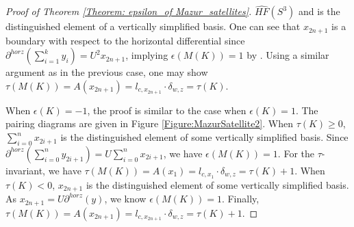\documentclass{amsart}
\theoremstyle{definition}
\theoremstyle{remark}
\numberwithin{equation}{section}
\numberwithin{equation}{section} \makeatletter
\begin{document}
\begin{proof}[Proof of Theorem \ref{Theorem: epsilon_of Mazur_satellites}]
$\widehat{HF}(S^3)$ and is the distinguished element of a vertically simplified basis. One can see that $x_{2n+1}$ is a boundary with respect to the horizontal differential since $\partial^{horz}(\sum_{i=1}^{k}y_i)=U^2x_{2n+1}$, implying $\epsilon(M(K))=1$ by \cite[Lemma 3.2 and Definition 3.4]{MR3217622}. Using a similar argument as in the previous case, one may show $\tau(M(K))=A(x_{2n+1})=l_{c,x_{2n+1}}\cdot \delta_{w,z}=\tau(K)$.
	
	When $\epsilon(K)=-1$, the proof is similar to the case when $\epsilon(K)=1$. The pairing diagrams are given in Figure \ref{Figure:MazurSatellite2}.
	When $\tau(K)\geq 0$, $\sum_{i=0}^{n}x_{2i+1}$ is the distinguished element of some vertically simplified basis. Since $\partial^{horz}(\sum_{i=0}^{n}y_{2i+1})=U\sum_{i=0}^{n}x_{2i+1}$, we have $\epsilon(M(K))=1$. For the $\tau$-invariant, we have $\tau(M(K))=A(x_1)=l_{c,x_1}\cdot\delta_{w,z}=\tau(K)+1$.
	When $\tau(K)< 0$, $x_{2n+1}$ is the distinguished element of some vertically simplified basis. As $x_{2n+1}=U \partial^{horz}(y) $, we know $\epsilon(M(K))=1$. Finally, $\tau(M(K))=A(x_{2n+1})=l_{c,x_{2n+1}}\cdot\delta_{w,z}=\tau(K)+1$.
	
\end{proof}


\end{document}
